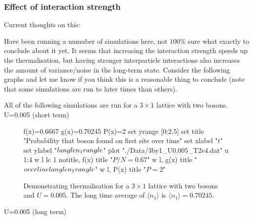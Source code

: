 \documentclass[a4paper, 10pt]{article}
\theoremstyle{plain}
\begin{document}
\subsubsection{Effect of interaction strength}

Current thoughts on this:



Have been running a numuber of simulations here, not $100\%$ sure what exactly
to conclude about it yet. It seems that increasing the interaction strength 
speeds up the thermalisation, but having stronger interparticle interactions also
increases the amount of variance/noise in the long-term state. Consider the 
following graphs and let me know if you think this is a reasonable thing to 
conclude (note that some simulations are run to later times than others).

All of the following simulations are run for a $3\times1$ lattice with two
bosons. U=0.005 (short term)

\begin{figure}[H]
    \centering
    \begin{gnuplot}[terminal=cairolatex, terminaloptions={lw 2}, scale=0.95]
	f(x)=0.6667
	g(x)=0.70245
	P(x)=2
	set yrange [0:2.5]
        set title "Probability that boson found on first site over time"
        set xlabel "$t$"
        set ylabel "$\\langle n_{1} \\rangle$"
        plot "./Data/3by1_U0.005_T2e4.dat" u 1:4 w l lc 1 notitle, f(x) title "$P/N=0.67$" w l, g(x) title "$\\overline{\\langle n_{1} \\rangle}$" w l, P(x) title "$P=2$" 
     \end{gnuplot}
     \vspace*{-5mm}
     \caption{Demonstrating thermalisation for a $3\times 1$ lattice
     with two bosons and $U=0.005$. The long time average of 
     $\langle n_1 \rangle$ is $\overline{\langle n_1 \rangle}=0.70245.$}
\end{figure}


U=0.005 (long term)
\end{document}
